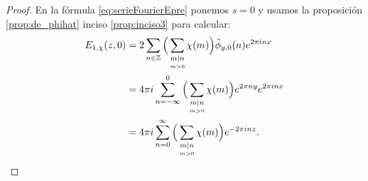 \begin{proof}
  En la f\'ormula \eqref{eq:serieFourierEpre} ponemos $s=0$ y usamos la proposici\'on
  \ref{prop:de_phihat} inciso \ref{prop:inciso3} para calcular:
  \begin{align*}
    E_{1,\chi}(z,0)
    &=2\sum_{n\in\mathbb{Z}}\Big(\sum_{\underset{m>0}{m\mid n}}\chi(m)\Big)\hat{\phi}_{y,0}(n)e^{2\pi inx}\\
    &=4\pi i\sum_{n=-\infty}^{0}\Big(\sum_{\underset{m>0}{m\mid n}}\chi(m)\Big)e^{2\pi ny}e^{2\pi inx}\\
    &= 4\pi i\sum_{n=0}^{\infty}\Big(\sum_{\underset{m>0}{m\mid n}}\chi(m)\Big)e^{-2\pi inz}.
  \end{align*}
  


  

\end{proof}
